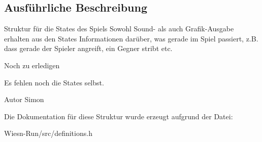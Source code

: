 \subsection{Ausführliche Beschreibung}
Struktur für die States des Spiels Sowohl Sound-\/ als auch Grafik-\/\-Ausgabe erhalten aus den States Informationen darüber, was gerade im Spiel passiert, z.\-B. dass gerade der Spieler angreift, ein Gegner stribt etc. 

\begin{DoxyRefDesc}{Noch zu erledigen}
\item[\hyperlink{todo__todo000002}{Noch zu erledigen}]Es fehlen noch die States selbst. \begin{DoxyAuthor}{Autor}
Simon 
\end{DoxyAuthor}
\end{DoxyRefDesc}


Die Dokumentation für diese Struktur wurde erzeugt aufgrund der Datei\-:\begin{DoxyCompactItemize}
\item 
Wiesn-\/\-Run/src/definitions.\-h\end{DoxyCompactItemize}
